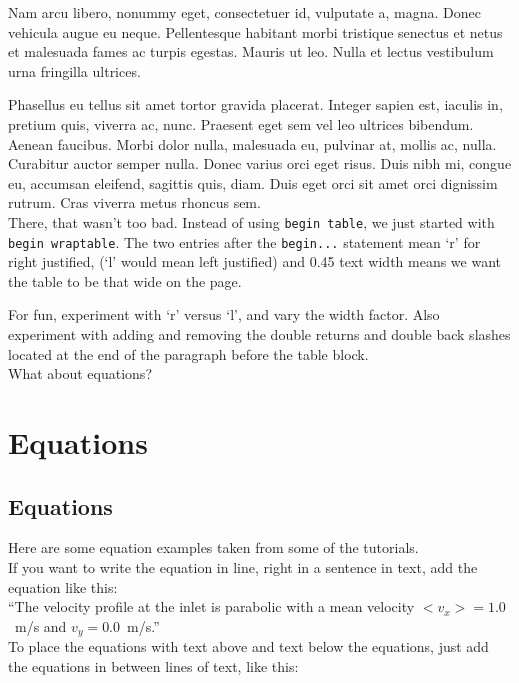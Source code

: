 Nam arcu libero, nonummy eget, consectetuer id, vulputate a, magna. Donec vehicula augue eu neque. Pellentesque habitant morbi tristique senectus et netus et malesuada fames ac turpis egestas. Mauris ut leo.  Nulla et lectus vestibulum urna fringilla ultrices.

Phasellus eu tellus sit amet tortor gravida placerat. Integer sapien est, iaculis in, pretium quis, viverra ac, nunc. Praesent eget sem vel leo ultrices bibendum. Aenean faucibus.  Morbi dolor nulla, malesuada eu, pulvinar at, mollis ac, nulla. Curabitur auctor semper nulla. Donec varius orci eget risus. Duis nibh mi, congue eu, accumsan eleifend, sagittis quis, diam. Duis eget orci sit amet orci dignissim rutrum.   Cras viverra metus rhoncus sem.\\

There, that wasn't too bad.  Instead of using \texttt{begin table}, we just started with \texttt{begin wraptable}.  The two entries after the \texttt{begin...} statement mean `r' for right justified, (`l' would mean left justified) and 0.45 text width means we want the table to be that wide on the page.  

For fun, experiment with `r' versus `l', and vary the width factor.  Also experiment with adding and removing  the double returns and double back slashes located at the end of the paragraph before the table block.\\

What about equations?

\chapter{Equations}

\section{Equations}

Here are some equation examples taken from some of the tutorials.\\

\noindent If you want to write the equation in line, right in a sentence in text, add the equation like this:\\

``The velocity profile at the inlet is parabolic with a mean velocity $<v_x>=1.0$~m/s and $v_y=0.0$~m/s.''\\

\noindent To place the equations with text above and text below the equations, just add the equations in between lines of text, like this:\\


